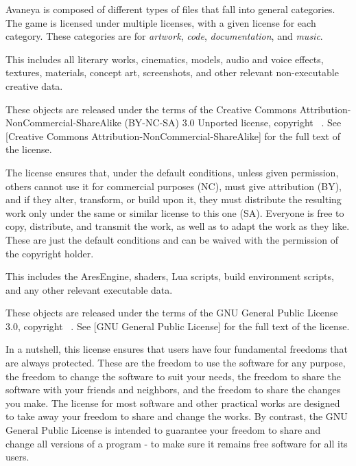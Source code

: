 

Avaneya is composed of different types of files that fall into general categories. The game is licensed under multiple licenses, with a given license for each category. These categories are for {\it artwork}, {\it code}, {\it documentation}, and {\it music}.

\startitemize[3]
\setupwhitespace[big]

This includes all literary works, cinematics, models, audio and voice effects, textures, materials, concept art, screenshots, and other relevant non-executable creative data. 

These objects are released under the terms of the Creative Commons Attribution-NonCommercial-ShareAlike (BY-NC-SA) 3.0 Unported license, copyright \CopyrightDates\ \CopyrightHolder. See [Creative Commons Attribution-NonCommercial-ShareAlike] for the full text of the license.

The license ensures that, under the default conditions, unless given permission, others cannot use it for commercial purposes (NC), must give attribution (BY), and if they alter, transform, or build upon it, they must distribute the resulting work only under the same or similar license to this one (SA). Everyone is free to copy, distribute, and transmit the work, as well as to adapt the work as they like. These are just the default conditions and can be waived with the permission of the copyright holder.


This includes the AresEngine, shaders, Lua scripts, build environment scripts, and any other relevant executable data.

These objects are released under the terms of the GNU General Public License 3.0, copyright \CopyrightDates\ \CopyrightHolder. See [GNU General Public License] for the full text of the license.

In a nutshell, this license ensures that users have four fundamental freedoms that are always protected. These are the freedom to use the software for any purpose, the freedom to change the software to suit your needs, the freedom to share the software with your friends and neighbors, and the freedom to share the changes you make. The license for most software and other practical works are designed to take away your freedom to share and change the works. By contrast, the GNU General Public License is intended to guarantee your freedom to share and change all versions of a program - to make sure it remains free software for all its users.

